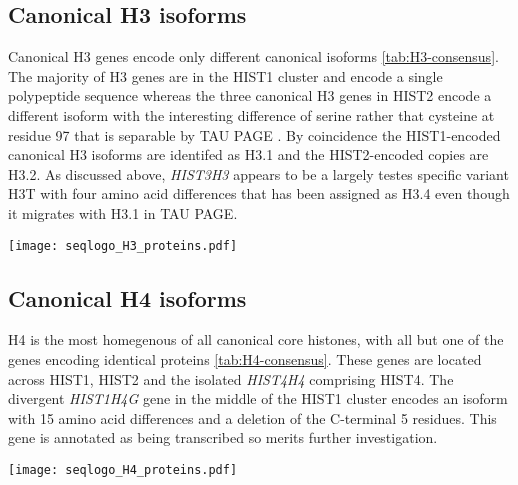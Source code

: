   \subsection{Canonical H3 isoforms}
	Canonical H3 genes encode only \HThreeUniqueProteins{} different canonical isoforms \ref{tab:H3-consensus}. 
	The majority of H3 genes are in the HIST1 cluster and encode a single polypeptide sequence \citep{Ederveen2011} 
	whereas the three canonical H3 genes in HIST2 encode a different isoform 
	with the interesting difference of serine rather that cysteine at residue 97 
	that is separable by TAU PAGE \citep{FranklinZweidler1977}.
	By coincidence the HIST1-encoded canonical H3 isoforms are identifed as H3.1 and the HIST2-encoded copies are H3.2.
	As discussed above, \textit{HIST3H3} appears to be a largely testes specific variant H3T 
	with four amino acid differences that has been assigned as H3.4 \citep{Talbert2012} 
	even though it migrates with H3.1 in TAU PAGE. 
	
  \begin{TableAndFigure*}
	\label{tab:H3-consensus}
	
	\label{fig:H3-weblogo}
	 \texttt{[image: seqlogo\_H3\_proteins.pdf]}
  \end{TableAndFigure*}

  \subsection{Canonical H4 isoforms}
	H4 is the most homegenous of all canonical core histones, 
	with all but one of the \HFourCodingGenes{} genes encoding identical proteins \ref{tab:H4-consensus}. 
	These genes are located across HIST1, HIST2 and the isolated \textit{HIST4H4} comprising HIST4.
	The divergent \textit{HIST1H4G} gene in the middle of the HIST1 cluster 
	encodes an isoform with 15 amino acid differences and a deletion of the C-terminal 5 residues. 
	This gene is annotated as being transcribed so merits further investigation.

  \begin{TableAndFigure*}
	\label{tab:H4-consensus}
	
	\label{fig:H4-weblogo}
	 \texttt{[image: seqlogo\_H4\_proteins.pdf]}
  \end{TableAndFigure*}


